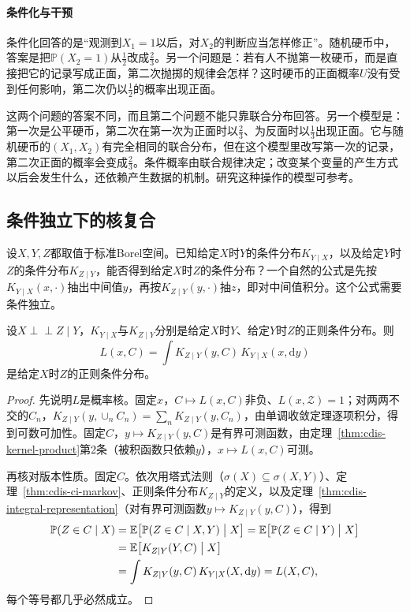 \paragraph{条件化与干预}
条件化回答的是“观测到$X_1=1$以后，对$X_2$的判断应当怎样修正”。随机硬币中，答案是把$\mathbb{P}(X_2=1)$从$\tfrac12$改成$\tfrac23$。另一个问题是：若有人不抛第一枚硬币，而是直接把它的记录写成正面，第二次抛掷的规律会怎样？这时硬币的正面概率$U$没有受到任何影响，第二次仍以$\tfrac12$的概率出现正面。

这两个问题的答案不同，而且第二个问题不能只靠联合分布回答。另一个模型是：第一次是公平硬币，第二次在第一次为正面时以$\tfrac23$、为反面时以$\tfrac13$出现正面。它与随机硬币的$(X_1,X_2)$有完全相同的联合分布，但在这个模型里改写第一次的记录，第二次正面的概率会变成$\tfrac23$。条件概率由联合规律决定；改变某个变量的产生方式以后会发生什么，还依赖产生数据的机制。研究这种操作的模型可参考。

\subsection{条件独立下的核复合}
\label{sec:cdis-composition}

设$X,Y,Z$都取值于标准Borel空间。已知给定$X$时$Y$的条件分布$K_{Y\mid X}$，以及给定$Y$时$Z$的条件分布$K_{Z\mid Y}$，能否得到给定$X$时$Z$的条件分布？一个自然的公式是先按$K_{Y\mid X}(x,\cdot)$抽出中间值$y$，再按$K_{Z\mid Y}(y,\cdot)$抽$z$，即对中间值积分。这个公式需要条件独立。

\begin{theorem}[核的复合]
\label{thm:cdis-composition}
设$X\perp\!\!\!\perp Z\mid Y$，$K_{Y\mid X}$与$K_{Z\mid Y}$分别是给定$X$时$Y$、给定$Y$时$Z$的正则条件分布。则
\begin{equation}
 L(x,C)=\int K_{Z\mid Y}(y,C)\,K_{Y\mid X}(x,\mathrm{d}y)
 \label{eq:cdis-composition}
\end{equation}
是给定$X$时$Z$的正则条件分布。
\end{theorem}

\begin{proof}
先说明$L$是概率核。固定$x$，$C\mapsto L(x,C)$非负、$L(x,\mathcal{Z})=1$；对两两不交的$C_n$，$K_{Z\mid Y}(y,\cup_nC_n)=\sum_nK_{Z\mid Y}(y,C_n)$，由单调收敛定理逐项积分，得到可数可加性。固定$C$，$y\mapsto K_{Z\mid Y}(y,C)$是有界可测函数，由定理~\ref{thm:cdis-kernel-product}第2条（被积函数只依赖$y$），$x\mapsto L(x,C)$可测。

再核对版本性质。固定$C$。依次用塔式法则（$\sigma(X)\subseteq\sigma(X,Y)$）、定理~\ref{thm:cdis-ci-markov}、正则条件分布$K_{Z\mid Y}$的定义，以及定理~\ref{thm:cdis-integral-representation}（对有界可测函数$y\mapsto K_{Z\mid Y}(y,C)$），得到
\[
 \begin{aligned}
 \mathbb{P}(Z\in C\mid X)
 &=\mathbb{E}\bigl[\mathbb{P}(Z\in C\mid X,Y)\bigm|X\bigr]
 =\mathbb{E}\bigl[\mathbb{P}(Z\in C\mid Y)\bigm|X\bigr]\\
 &=\mathbb{E}\bigl[K_{Z\mid Y}(Y,C)\bigm|X\bigr]\\
 &=\int K_{Z\mid Y}(y,C)\,K_{Y\mid X}(X,\mathrm{d}y)=L(X,C),
 \end{aligned}
\]
每个等号都几乎必然成立。
\end{proof}

